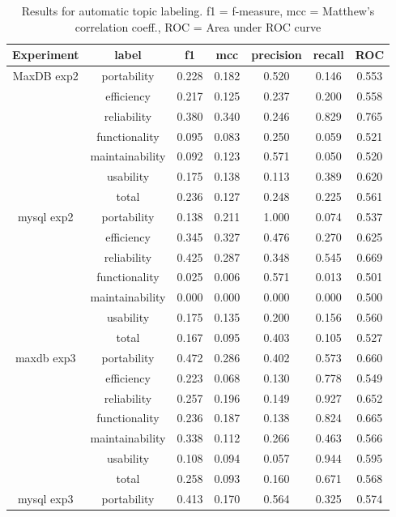 \documentclass{acm_proc_article-sp}
\begin{document}
\begin{table}[h]
	\caption{Results for automatic topic labeling. f1 = f-measure, mcc = Matthew's correlation coeff., ROC = Area under ROC curve}
	\centering
	\label{tbl:maxdb-unsup-results}
\begin{tabular}{c|c|c|c|c|c|c}
\toprule
Experiment & label & f1 & mcc & precision & recall & ROC  \\ 
\midrule
MaxDB exp2 & portability & 0.228 & 0.182 & 0.520 & 0.146 & 0.553 \\ 
 & efficiency & 0.217 & 0.125 & 0.237 & 0.200 & 0.558\\ 
 & reliability & 0.380 & 0.340 & 0.246 & 0.829 & 0.765 \\ 
 & functionality & 0.095 & 0.083 & 0.250 & 0.059 & 0.521 \\ 
 & maintainability & 0.092 & 0.123 & 0.571 & 0.050 & 0.520 \\ 
 & usability & 0.175 & 0.138 & 0.113 & 0.389 & 0.620 \\ 
 & total & 0.236 & 0.127 & 0.248 & 0.225 & 0.561 \\ 
\midrule
mysql exp2 & portability & 0.138 & 0.211 & 1.000 & 0.074 & 0.537 \\ 
 & efficiency & 0.345 & 0.327 & 0.476 & 0.270 & 0.625 \\ 
 & reliability & 0.425 & 0.287 & 0.348 & 0.545 & 0.669 \\ 
 & functionality & 0.025 & 0.006 & 0.571 & 0.013 & 0.501 \\ 
 & maintainability & 0.000 & 0.000 & 0.000 & 0.000 & 0.500 \\ 
 & usability & 0.175 & 0.135 & 0.200 & 0.156 & 0.560 \\ 
 & total & 0.167 & 0.095 & 0.403 & 0.105 & 0.527 \\ 
\midrule
maxdb exp3 & portability & 0.472 & 0.286 & 0.402 & 0.573 & 0.660 \\ 
 & efficiency & 0.223 & 0.068 & 0.130 & 0.778 & 0.549 \\ 
 & reliability & 0.257 & 0.196 & 0.149 & 0.927 & 0.652 \\ 
 & functionality & 0.236 & 0.187 & 0.138 & 0.824 & 0.665 \\ 
 & maintainability & 0.338 & 0.112 & 0.266 & 0.463 & 0.566 \\ 
 & usability & 0.108 & 0.094 & 0.057 & 0.944 & 0.595 \\ 
 & total & 0.258 & 0.093 & 0.160 & 0.671 & 0.568 \\ 
\midrule
mysql exp3 & portability & 0.413 & 0.170 & 0.564 & 0.325 & 0.574 \\ 

\end{tabular}
\end{table}
\end{document}
